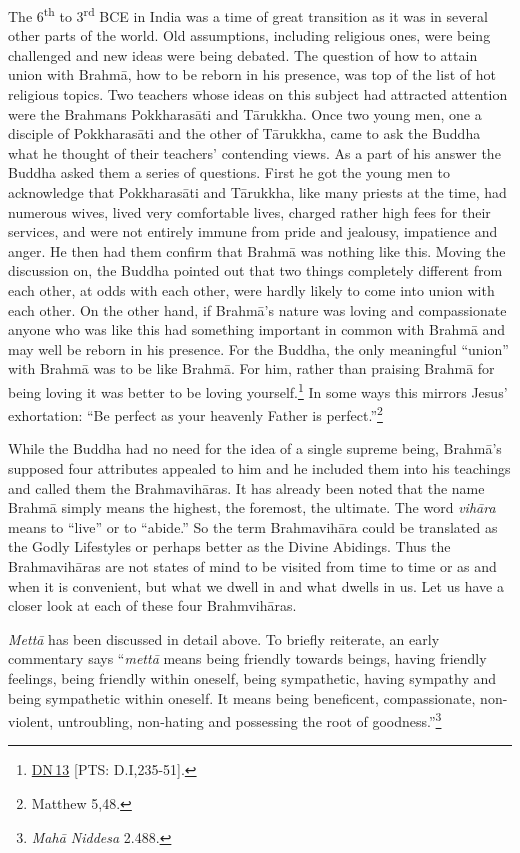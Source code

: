 \documentclass[10pt, openright]{book}
\begin{document}
The 6\textsuperscript{th} to 3\textsuperscript{rd} BCE in India was a time of great transition as it was in several other parts of the world. Old assumptions, including religious ones, were being challenged and new ideas were being debated. The question of how to attain union with Brahmā, how to be reborn in his presence, was top of the list of hot religious topics. Two teachers whose ideas on this subject had attracted attention were the Brahmans Pokkharasāti and Tārukkha. Once two young men, one a disciple of Pokkharasāti and the other of Tārukkha, came to ask the Buddha what he thought of their teachers’ contending views. As a part of his answer the Buddha asked them a series of questions. First he got the young men to acknowledge that Pokkharasāti and Tārukkha, like many priests at the time, had numerous wives, lived very comfortable lives, charged rather high fees for their services, and were not entirely immune from pride and jealousy, impatience and anger. He then had them confirm that Brahmā was nothing like this. Moving the discussion on, the Buddha pointed out that two things completely different from each other, at odds with each other, were hardly likely to come into union with each other. On the other hand, if Brahmā’s nature was loving and compassionate anyone who was like this had something important in common with Brahmā and may well be reborn in his presence. For the Buddha, the only meaningful “union” with Brahmā was to be like Brahmā. For him, rather than praising Brahmā for being loving it was better to be loving yourself.\footnote {\href{https://suttacentral.net/dn13/en/sujato}{DN 13} [PTS: D.I,235-51].} In some ways this mirrors Jesus’ exhortation: “Be perfect as your heavenly Father is perfect.”\footnote {Matthew 5,48.}


While the Buddha had no need for the idea of a single supreme being, Brahmā’s supposed four attributes appealed to him and he included them into his teachings and called them the Brahmavihāras. It has already been noted that the name Brahmā simply means the highest, the foremost, the ultimate. The word \textit{vihāra} means to “live” or to “abide.” So the term Brahmavihāra could be translated as the Godly Lifestyles or perhaps better as the Divine Abidings. Thus the Brahmavihāras are not states of mind to be visited from time to time or as and when it is convenient, but what we dwell in and what dwells in us. Let us have a closer look at each of these four Brahmvihāras.


\textit{Mettā} has been discussed in detail above. To briefly reiterate, an early commentary says “\textit{mettā} means being friendly towards beings, having friendly feelings, being friendly within oneself, being sympathetic, having sympathy and being sympathetic within oneself. It means being beneficent, compassionate, non-violent, untroubling, non-hating and possessing the root of goodness.”\footnote {\textit{Mahā Niddesa} 2.488.}
\end{document}
